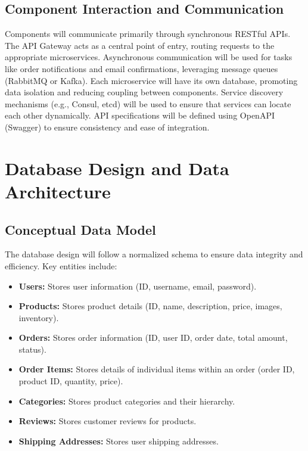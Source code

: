 \documentclass[11pt,a4paper,oneside]{article}
\begin{document}
\subsection{Component Interaction and Communication}

Components will communicate primarily through synchronous RESTful APIs.  The API Gateway acts as a central point of entry, routing requests to the appropriate microservices.  Asynchronous communication will be used for tasks like order notifications and email confirmations, leveraging message queues (RabbitMQ or Kafka).  Each microservice will have its own database, promoting data isolation and reducing coupling between components.  Service discovery mechanisms (e.g., Consul, etcd) will be used to ensure that services can locate each other dynamically.  API specifications will be defined using OpenAPI (Swagger) to ensure consistency and ease of integration.

\section{Database Design and Data Architecture}

\subsection{Conceptual Data Model}

The database design will follow a normalized schema to ensure data integrity and efficiency.  Key entities include:

\begin{itemize}
    \item \textbf{Users:} Stores user information (ID, username, email, password).
    \item \textbf{Products:} Stores product details (ID, name, description, price, images, inventory).
    \item \textbf{Orders:} Stores order information (ID, user ID, order date, total amount, status).
    \item \textbf{Order Items:} Stores details of individual items within an order (order ID, product ID, quantity, price).
    \item \textbf{Categories:} Stores product categories and their hierarchy.
    \item \textbf{Reviews:} Stores customer reviews for products.
    \item \textbf{Shipping Addresses:} Stores user shipping addresses.
\end{itemize}
\end{document}
